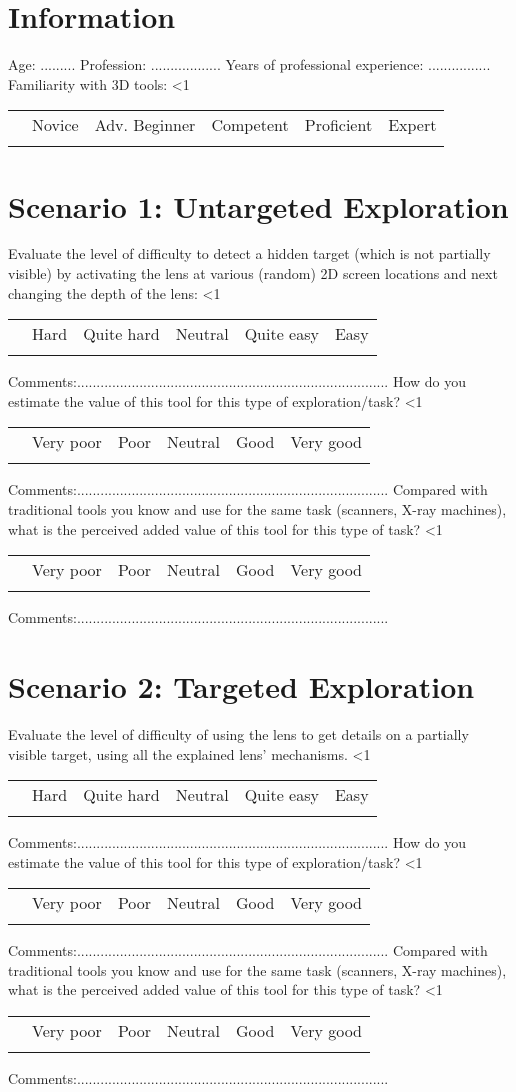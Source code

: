 \documentclass[a4paper]{exam}
\makeatletter
\newcounter{mquestion}
\newcounter{row}
\newcommand\addtabtoks[1]{\@tabtoks\expandafter{\the\@tabtoks#1}}
\newcommand*\resettabtoks{\@tabtoks{}}
\newcommand*\printtabtoks{\the\@tabtoks}
\newcommand\CheckTable[1]{%
  \setcounter{mquestion}{0}
  \setcounter{row}{0}
  \resettabtoks
  \loop\ifnum\therow<#1\relax
    \stepcounter{row}
    \addtabtoks{& $\square$ & $\square$ & $\square$ & $\square$ & $\square$ \\}%
  \repeat
  \begin{longtable}{>{\stepcounter{mquestion}}l*{5}{c}}
    \multicolumn{1}{c}{} & Very poor & Poor & Neutral & Good & Very good \\
    \printtabtoks
  \end{longtable}%
}
\newcommand\CheckTablelevel[1]{%
  \setcounter{mquestion}{0}
  \setcounter{row}{0}
  \resettabtoks
  \loop\ifnum\therow<#1\relax
    \stepcounter{row}
    \addtabtoks{& $\square$ & $\square$ & $\square$ & $\square$ & $\square$ \\}%
  \repeat
  \begin{longtable}{>{\stepcounter{mquestion}}l*{5}{c}}
    \multicolumn{1}{c}{} & Novice &  Adv. Beginner &  Competent & Proficient  & Expert \\
    \printtabtoks
  \end{longtable}%
}
\newcommand\CheckTableDifficulty[1]{%
  \setcounter{mquestion}{0}
  \setcounter{row}{0}
  \resettabtoks
  \loop\ifnum\therow<#1\relax
    \stepcounter{row}
    \addtabtoks{& $\square$ & $\square$ & $\square$ & $\square$ & $\square$ \\}%
  \repeat
  \begin{longtable}{>{\stepcounter{mquestion}}l*{5}{c}}
    \multicolumn{1}{c}{} & Hard & Quite hard & Neutral & Quite easy & Easy \\
    \printtabtoks
  \end{longtable}%
}
\makeatother
\begin{document}
\section{Information}

 Age: ......... \newline
 Profession: .................. \newline
 Years of professional experience: ................ \newline
 Familiarity with 3D tools: 
\CheckTablelevel{1}

\section{Scenario 1: Untargeted Exploration}
Evaluate the level of difficulty to detect a hidden target (which is not partially visible) by activating the lens at various (random) 2D screen locations and next changing the depth of the lens:
\CheckTableDifficulty{1}
Comments:................................................................................ \newline \newline
How do you estimate the value of this tool for this type of exploration/task?
\CheckTable{1}
Comments:................................................................................ \newline \newline
Compared with traditional tools you know and use for the same task (scanners, X-ray machines), what is the perceived added value of this tool for this type of task?
\CheckTable{1}
Comments:................................................................................ \newline \newline

\section{Scenario 2: Targeted Exploration}
Evaluate the level of difficulty of using the lens to get details on a partially visible target, using all the explained lens' mechanisms.
\CheckTableDifficulty{1}
Comments:................................................................................ \newline \newline
How do you estimate the value of this tool for this type of exploration/task?
\CheckTable{1}
Comments:................................................................................ \newline \newline
Compared with traditional tools you know and use for the same task (scanners, X-ray machines), what is the perceived added value of this tool for this type of task?
\CheckTable{1}
Comments:................................................................................ 
\end{document}
